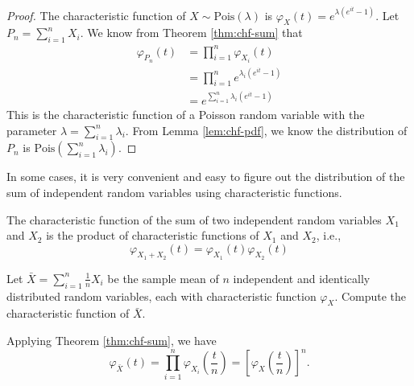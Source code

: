 \documentclass[
  lang=cn,
  11pt,
  scheme=chinese,
  chinesefont=nofont,
  bibstyle=apalike]{elegantbook}
\begin{document}
\begin{proof}
\iffalse{} {证明 } \fi{}The characteristic function of \(X\sim\mathrm{Pois}(\lambda)\) is \(\varphi _{X}(t)=e^{\lambda (e^{it}-1)}\). Let \(P_n=\sum_{i=1}^nX_i\). We know from Theorem \ref{thm:chf-sum} that \begin{equation*}
\begin{split}
\varphi _{P_{n}}(t) & =\prod_{i=1}^n\varphi _{X_i}(t) \\
& =\prod_{i=1}^n e^{\lambda_i (e^{it}-1)} \\
& = e^{\sum_{i=1}^n \lambda_i (e^{it}-1)}
\end{split}
\end{equation*} This is the characteristic function of a Poisson random variable with the parameter \(\lambda=\sum_{i=1}^n \lambda_i\). From Lemma \ref{lem:chf-pdf}, we know the distribution of \(P_n\) is \(\mathrm{Pois}(\sum_{i=1}^n\lambda_i)\). \end{proof}

\begin{remark}
\iffalse{} {注 } \fi{}In some cases, it is very convenient and easy to figure out the distribution of the sum of independent random variables using characteristic functions. \end{remark}

\begin{corollary}{}{}
\protect\hypertarget{cor:unnamed-chunk-8}{}{\label{cor:unnamed-chunk-8} }The characteristic function of the sum of two independent random variables \(X_1\) and \(X_2\) is the product of characteristic functions of \(X_1\) and \(X_2\), i.e., \[\varphi _{X_1+X_2}(t)=\varphi _{X_1}(t) \varphi _{X_2}(t)\] \end{corollary}

\begin{exercise}
\protect\hypertarget{exr:unnamed-chunk-9}{}{\label{exr:unnamed-chunk-9} \iffalse (Characteristic Function of the Sample Mean) \fi{} }Let \(\bar{X}=\sum_{i=1}^n \frac{1}{n} X_i\) be the sample mean of \(n\) independent and identically distributed random variables, each with characteristic function \(\varphi _{X}\). Compute the characteristic function of \(\bar{X}\). \end{exercise}

\begin{solution}
\iffalse{} {解 } \fi{}Applying Theorem \ref{thm:chf-sum}, we have \[\varphi _{\bar{X}}(t)=\prod_{i=1}^n \varphi _{X_i}\left(\frac{t}{n}\right)=\left[\varphi _{X}\left(\frac{t}{n}\right)\right]^n.\] \end{solution}
\end{document}
